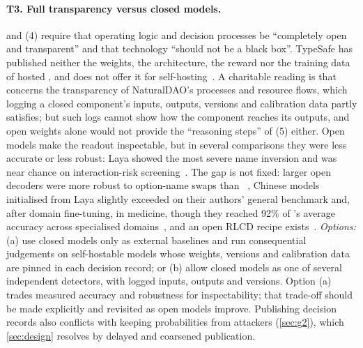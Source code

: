 \paragraph{T3. Full transparency versus closed models.}
 and (4) require that operating logic and decision processes be ``completely open and transparent'' and that technology ``should not be a black box''.
TypeSafe has published neither the weights, the architecture, the reward nor the training data of hosted \jev{}, and does not offer it for self-hosting~\cite{arx24574,arx28919,arx00346}.
A charitable reading is that  concerns the transparency of NaturalDAO's processes and resource flows, which logging a closed component's inputs, outputs, versions and calibration data partly satisfies; but such logs cannot show how the component reaches its outputs, and open weights alone would not provide the ``reasoning steps'' of (5) either.
Open models make the readout inspectable, but in several comparisons they were less accurate or less robust: Laya showed the most severe name inversion and was near chance on interaction-risk screening~\cite{arx26758,arx33401}.
The gap is not fixed: larger open decoders were more robust to option-name swaps than \jev{}~\cite{arx00346}, Chinese models initialised from Laya slightly exceeded \jev{} on their authors' general benchmark and, after domain fine-tuning, in medicine, though they reached 92\% of \jev{}'s average accuracy across specialised domains~\cite{arx36965}, and an open RLCD recipe exists~\cite{arx38850}.
\emph{Options:} (a) use closed models only as external baselines and run consequential judgements on self-hostable models whose weights, versions and calibration data are pinned in each decision record; or (b) allow closed models as one of several independent detectors, with logged inputs, outputs and versions.
Option (a) trades measured accuracy and robustness for inspectability; that trade-off should be made explicitly and revisited as open models improve.
Publishing decision records also conflicts with keeping probabilities from attackers (\cref{sec:g2}), which \cref{sec:design} resolves by delayed and coarsened publication.

